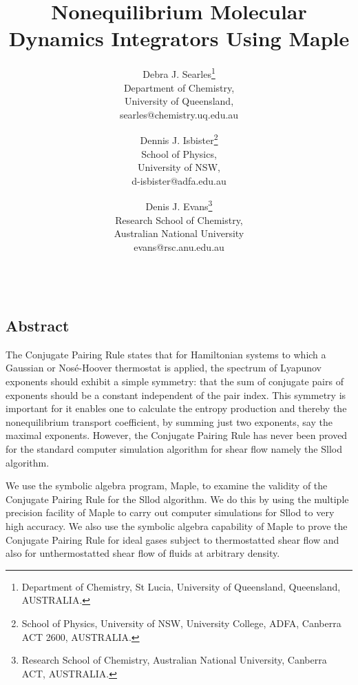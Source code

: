 \documentclass{article}
\title{Nonequilibrium Molecular Dynamics Integrators Using Maple}
\author{
Debra J. Searles\thanks{Department of Chemistry, St Lucia, University of
Queensland, Queensland, AUSTRALIA.}\\
Department of Chemistry,\\
University of Queensland,\\
searles@chemistry.uq.edu.au
\and
Dennis J. Isbister\thanks{School of Physics,
University of NSW, University College, ADFA, Canberra ACT 2600,
AUSTRALIA.}\\
School of Physics,\\
University of NSW,\\
d-isbister@adfa.edu.au
\and
Denis J. Evans\thanks{Research School of Chemistry,
Australian National University, Canberra ACT, AUSTRALIA.}\\
Research School of  Chemistry, \\
Australian National University\\
evans@rsc.anu.edu.au
}
\date{~~~}
\begin{document}
\maketitle

\begin{center}
\section*{Abstract}
\end{center}
The Conjugate Pairing Rule states that for Hamiltonian systems to
which a Gaussian or Nos\'e-Hoover thermostat is applied, the spectrum
of Lyapunov exponents should exhibit a simple symmetry: that the sum
of conjugate pairs of exponents should be a constant independent
of the pair index. This symmetry is important for it enables one
to calculate the entropy production and thereby the nonequilibrium
transport coefficient, by summing just two exponents, say the maximal
exponents. However, the Conjugate Pairing Rule has never been proved
for the standard computer simulation algorithm for shear flow namely
the Sllod algorithm.

We use the symbolic algebra program, Maple, to examine the validity
of the Conjugate Pairing Rule for the Sllod algorithm.  We do this by
using the multiple precision facility of Maple to carry out computer
simulations for Sllod to very high accuracy. We also use the
symbolic algebra capability of Maple to prove the Conjugate Pairing Rule
for ideal gases subject to thermostatted shear flow and also for
unthermostatted shear flow of fluids at arbitrary density.
\vspace{3.0in}

\end{document}
